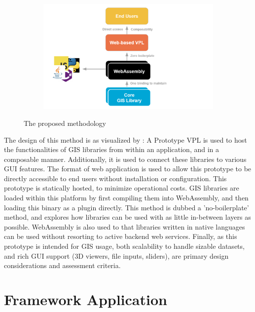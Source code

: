 \begin{figure}
  \centering
  \begin{subfigure}[b]{0.80\linewidth}
    \centering
    \includegraphics[width=\linewidth]{proposal.png}
  \end{subfigure}%
  \caption{The proposed methodology}
  \label{fig:proposal}
\end{figure}

The design of this method is as visualized by : 
A Prototype VPL is used to host the functionalities of \ac{GIS} libraries from within an application, and in a composable manner. Additionally, it is used to connect these libraries to various \ac{GUI} features. 
The format of web application is used to allow this prototype to be directly accessible to end users without installation or configuration. 
This prototype is statically hosted, to minimize operational costs.
\ac{GIS} libraries are loaded within this platform by first compiling them into WebAssembly, and then loading this binary as a plugin directly. 
This method is dubbed a 'no-boilerplate' method, and explores how libraries can be used with as little in-between layers as possible.
WebAssembly is also used to that libraries written in native languages can be used without resorting to active backend web services. 
Finally, as this prototype is intended for \ac{GIS} usage, both scalability to handle sizable datasets, and rich \ac{GUI} support (3D viewers, file inputs, sliders), are primary design considerations and assessment criteria. 

\section{Framework Application}


